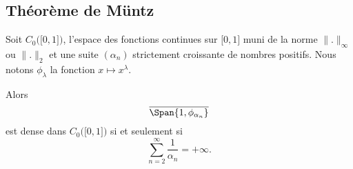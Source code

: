 \subsection{Théorème de Müntz}

\begin{theorem}  \label{ThoAEYDdHp}
	Soit \( C_0\big( \mathopen[ 0 , 1 \mathclose] \big)\), l'espace des fonctions continues sur \( \mathopen[ 0 , 1 \mathclose]\) muni de la norme \( \| . \|_{\infty}\) ou \( \| . \|_2\) et une suite \( (\alpha_n)\) strictement croissante de nombres positifs. Nous notons \( \phi_{\lambda}\) la fonction \( x\mapsto x^{\lambda}\).

	Alors
	\begin{equation}
		\overline{  \Span\{1, \phi_{\alpha_n} \} }
	\end{equation}
	est dense dans \( C_0\big( \mathopen[ 0 , 1 \mathclose] \big)\)  si et seulement si
	\begin{equation}
		\sum_{n=2}^{\infty}\frac{1}{ \alpha_n }=+\infty.
	\end{equation}
\end{theorem}

